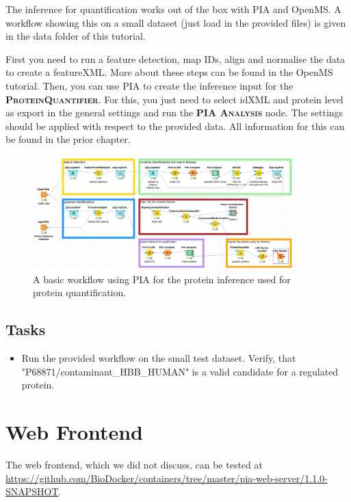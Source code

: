 \documentclass[a4paper,11pt,twoside]{article}
\newcommand{\knimenode}[1]{{\scshape\bfseries #1}}
\begin{document}
The inference for quantification works out of the box with PIA and OpenMS. A
workflow showing this on a small dataset (just load in the provided files) is
given in the data folder of this tutorial.

First you need to run a feature detection, map IDs, align and normalise
the data to create a featureXML. More about these steps can be found in the
OpenMS tutorial. Then, you can use PIA to create the inference input for the
\knimenode{ProteinQuantifier}. For this, you just need to select idXML and
protein level as export in the general settings and run the
\knimenode{PIA Analysis} node. The settings should be applied with respect to
the provided data. All information for this can be found in the prior chapter.

\begin{figure}[ht!]
	\centering
	\includegraphics[width=0.9\textwidth]{graphics/quant_workflow}
	\caption{A basic workflow using PIA for the protein inference used for
	protein quantification.}
	\label{quant_workflow}
\end{figure}

\subsection{Tasks}

\begin{itemize}
	\item Run the provided workflow on the small test dataset. Verify, that\\
	"P68871/contaminant\_HBB\_HUMAN" is a valid candidate for a regulated protein.
\end{itemize}



\newpage
\section{Web Frontend}

The web frontend, which we did not discuss, can be tested at
\url{https://github.com/BioDocker/containers/tree/master/pia-web-server/1.1.0-SNAPSHOT}.
\end{document}

